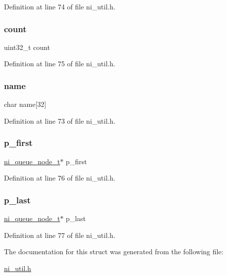 Definition at line 74 of file ni\+\_\+util.\+h.

\mbox{\label{struct__ni__queue__t_a86988a65e0d3ece7990c032c159786d6}} 
\subsubsection{\texorpdfstring{count}{count}}
{\footnotesize\ttfamily uint32\+\_\+t count}



Definition at line 75 of file ni\+\_\+util.\+h.

\mbox{\label{struct__ni__queue__t_abc1e86d7c344fe34ff09e72d4595ab7e}} 
\subsubsection{\texorpdfstring{name}{name}}
{\footnotesize\ttfamily char name\mbox{[}32\mbox{]}}



Definition at line 73 of file ni\+\_\+util.\+h.

\mbox{\label{struct__ni__queue__t_a768ec5faf7b000ebcdfb3a105f5938a2}} 
\subsubsection{\texorpdfstring{p\_first}{p\_first}}
{\footnotesize\ttfamily \mbox{\hyperlink{ni__util_8h_aecbc45db1f33b1a7eb1b32a6be3e7cce}{ni\+\_\+queue\+\_\+node\+\_\+t}}$\ast$ p\+\_\+first}



Definition at line 76 of file ni\+\_\+util.\+h.

\mbox{\label{struct__ni__queue__t_a337ed7e32c929deb2cc1dc12f52f21b8}} 
\subsubsection{\texorpdfstring{p\_last}{p\_last}}
{\footnotesize\ttfamily \mbox{\hyperlink{ni__util_8h_aecbc45db1f33b1a7eb1b32a6be3e7cce}{ni\+\_\+queue\+\_\+node\+\_\+t}}$\ast$ p\+\_\+last}



Definition at line 77 of file ni\+\_\+util.\+h.



The documentation for this struct was generated from the following file\+:\begin{DoxyCompactItemize}
\item 
\mbox{\hyperlink{ni__util_8h}{ni\+\_\+util.\+h}}\end{DoxyCompactItemize}
